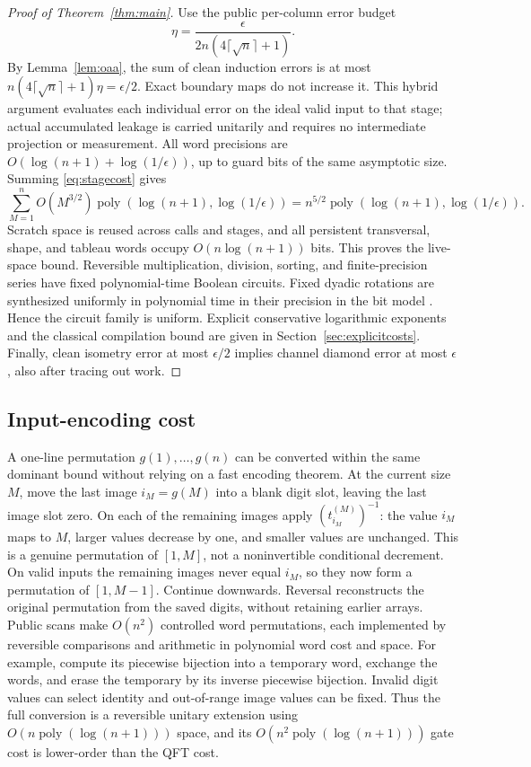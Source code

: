 \documentclass[11pt]{article}
\theoremstyle{definition}
\newcommand{\poly}{\operatorname{poly}}
\begin{document}
\begin{proof}[Proof of Theorem~\ref{thm:main}]
Use the public per-column error budget
\begin{equation}\label{eq:budget}
 \eta=\frac{\epsilon}{2n(4\lceil\sqrt n\rceil+1)}.
\end{equation}
By Lemma~\ref{lem:oaa}, the sum of clean induction errors is at most
$n(4\lceil\sqrt n\rceil+1)\eta=\epsilon/2$. Exact boundary maps do not
increase it. This hybrid argument evaluates each individual error on the
ideal valid input to that stage; actual accumulated leakage is carried
unitarily and requires no intermediate projection or measurement.
All word precisions are $O(\log(n+1)+\log(1/\epsilon))$, up to guard
bits of the same asymptotic size. Summing \eqref{eq:stagecost} gives
\[
 \sum_{M=1}^n O(M^{3/2})\poly(\log(n+1),\log(1/\epsilon))
 =n^{5/2}\poly(\log(n+1),\log(1/\epsilon)).
\]
Scratch space is reused across calls and stages, and all persistent
transversal, shape, and tableau words occupy $O(n\log(n+1))$ bits.
This proves the live-space bound. Reversible multiplication, division,
sorting, and finite-precision series have fixed polynomial-time Boolean
circuits. Fixed dyadic rotations are synthesized uniformly in polynomial
time in their precision in the bit model \cite{mw}. Hence the circuit
family is uniform. Explicit conservative logarithmic exponents and the
classical compilation bound are given in Section~\ref{sec:explicitcosts}.
Finally, clean isometry error at most $\epsilon/2$ implies channel
diamond error at most $\epsilon$, also after tracing out work.
\end{proof}

\subsection{Input-encoding cost}

A one-line permutation $g(1),\ldots,g(n)$ can be converted within the
same dominant bound without relying on a fast encoding theorem. At the
current size $M$, move the last image $i_M=g(M)$ into a blank digit slot,
leaving the last image slot zero. On each of the remaining images apply
$(t_{i_M}^{(M)})^{-1}$: the value $i_M$ maps to $M$, larger values decrease
by one, and smaller values are unchanged. This is a genuine permutation
of $[1,M]$, not a noninvertible conditional decrement. On valid inputs
the remaining images never equal $i_M$, so they now form a permutation
of $[1,M-1]$. Continue downwards. Reversal reconstructs the original
permutation from the saved digits, without retaining earlier arrays.
Public scans make $O(n^2)$ controlled word permutations, each implemented
by reversible comparisons and arithmetic in polynomial word cost and
space. For example, compute its piecewise bijection into a temporary word,
exchange the words, and erase the temporary by its inverse piecewise
bijection. Invalid digit values can select identity and out-of-range
image values can be fixed. Thus the full conversion is a reversible
unitary extension using $O(n\poly(\log(n+1)))$ space, and its
$O(n^2\poly(\log(n+1)))$ gate cost is lower-order than the QFT cost.
\end{document}
